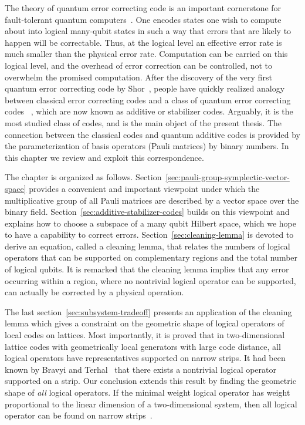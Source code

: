 
The theory of quantum error correcting code
is an important cornerstone for fault-tolerant quantum computers~\cite{Shor1996Fault-tolerant,Preskill1998Fault-tolerant}.
One encodes states one wish to compute about into logical many-qubit states
in such a way that errors that are likely to happen will be correctable.
Thus, at the logical level an effective error rate is much smaller than the physical error rate.
Computation can be carried on this logical level,
and the overhead of error correction can be controlled, not to overwhelm the promised computation.
After the discovery of the very first quantum error correcting code by Shor~\cite{Shor1995nine},
people have quickly realized analogy between classical error correcting codes and a class of quantum error correcting codes%
~\cite{CalderbankRainsShorEtAl1997Quantum,Gottesman1996Saturating},
which are now known as additive or stabilizer codes.
Arguably, it is the most studied class of codes, and is the main object of the present thesis.
The connection between the classical codes and quantum additive codes is provided
by the parameterization of basis operators (Pauli matrices) by binary numbers.
In this chapter we review and exploit this correspondence.

The chapter is organized as follows.
Section~\ref{sec:pauli-group-symplectic-vector-space} provides a convenient and important viewpoint
under which the multiplicative group of all Pauli matrices are described by a vector space over the binary field.
Section~\ref{sec:additive-stabilizer-codes} builds on this viewpoint and explains how to choose a subspace
of a many qubit Hilbert space, which we hope to have a capability to correct errors.
Section~\ref{sec:cleaning-lemma} is devoted to derive an equation, called a cleaning lemma,
that relates the numbers of logical operators 
that can be supported on complementary regions and the total number of logical qubits.
It is remarked that the cleaning lemma implies 
that any error occurring within a region, where no nontrivial logical operator can be supported,
can actually be corrected by a physical operation.

The last section~\ref{sec:subsystem-tradeoff}
presents an application of the cleaning lemma 
which gives a constraint on the geometric shape of logical operators of local codes on lattices.
Most importantly, it is proved that in two-dimensional lattice codes with geometrically local generators with large code distance,
all logical operators have representatives supported on narrow strips.
It had been known by Bravyi and Terhal~\cite{BravyiTerhal2009no-go} 
that there exists a nontrivial logical operator supported on a strip.
Our conclusion extends this result by finding the geometric shape of \emph{all} logical operators.
If the minimal weight logical operator has weight proportional to the linear dimension of a two-dimensional system,
then all logical operator can be found on narrow strips~\cite{HaahPreskill2012tradeoff}.


